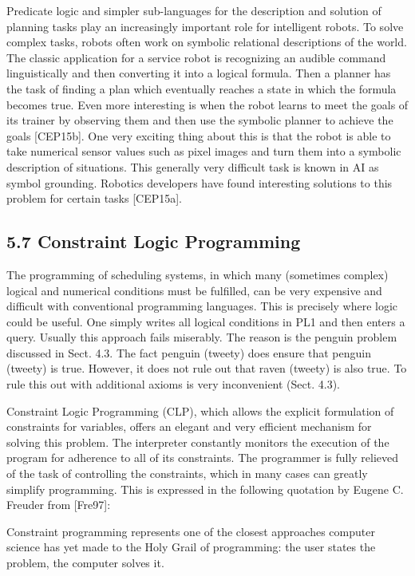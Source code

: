 \documentclass[10pt]{article}
\begin{document}
Predicate logic and simpler sub-languages for the description and solution of planning tasks play an increasingly important role for intelligent robots. To solve complex tasks, robots often work on symbolic relational descriptions of the world. The classic application for a service robot is recognizing an audible command linguistically and then converting it into a logical formula. Then a planner has the task of finding a plan which eventually reaches a state in which the formula becomes true. Even more interesting is when the robot learns to meet the goals of its trainer by observing them and then use the symbolic planner to achieve the goals [CEP15b]. One very exciting thing about this is that the robot is able to take numerical sensor values such as pixel images and turn them into a symbolic description of situations. This generally very difficult task is known in AI as symbol grounding. Robotics developers have found interesting solutions to this problem for certain tasks [CEP15a].

\subsection*{5.7 Constraint Logic Programming}
The programming of scheduling systems, in which many (sometimes complex) logical and numerical conditions must be fulfilled, can be very expensive and difficult with conventional programming languages. This is precisely where logic could be useful. One simply writes all logical conditions in PL1 and then enters a query. Usually this approach fails miserably. The reason is the penguin problem discussed in Sect. 4.3. The fact penguin (tweety) does ensure that penguin (tweety) is true. However, it does not rule out that raven (tweety) is also true. To rule this out with additional axioms is very inconvenient (Sect. 4.3).

Constraint Logic Programming (CLP), which allows the explicit formulation of constraints for variables, offers an elegant and very efficient mechanism for solving this problem. The interpreter constantly monitors the execution of the program for adherence to all of its constraints. The programmer is fully relieved of the task of controlling the constraints, which in many cases can greatly simplify programming. This is expressed in the following quotation by Eugene C. Freuder from [Fre97]:

\begin{displayquote}
Constraint programming represents one of the closest approaches computer science has yet made to the Holy Grail of programming: the user states the problem, the computer solves it.
\end{displayquote}
\end{document}
